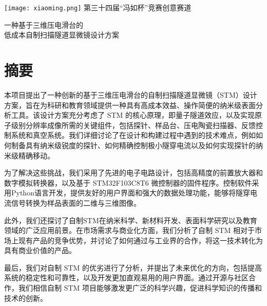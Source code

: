 \documentclass{article}
\begin{document}
\def\Fengru{第三十四届“冯如杯”竞赛创意赛道\\}
\vspace{32pt}
\begin{center}
	\texttt{[image: xiaoming.png]}
	\vskip 6pt
	\xiaoer
	\zhongsong
	第三十四届“冯如杯”竞赛创意赛道
\end{center}
\vspace{12pt}
\begin{spacing}{3}
	\begin{center} 
		\erhao
		\zhongsong
		一种基于三维压电滑台的\\低成本自制扫描隧道显微镜设计方案
	\end{center}
\end{spacing}




\renewcommand{\headrulewidth}{0pt}%
\clearpage
{} %

\xiaosi
\section*{摘要}
{}
\begin{spacing}{1.5}
	\setParDis %
	本项目提出了一种创新的基于三维压电滑台的自制扫描隧道显微镜（STM）设计方案，旨在为科研和教育领域提供一种具有高成本效益、操作简便的纳米级表面分析工具。该设计方案充分考虑了 STM 的核心原理，即量子隧道效应，以及实现原子级别分辨率成像所需的关键组件，包括探针、样品台、压电陶瓷扫描器、反馈控制系统和真空系统。我们详细讨论了在设计和构建过程中遇到的技术难点，例如如何制备具有纳米级锐度的探针、如何精确控制极小隧穿电流以及如何实现探针的纳米级精确移动。
	
	为了解决这些挑战，我们采用了先进的电子电路设计，包括高精度的前置放大器和数字模拟转换器，以及基于 STM32F103C8T6 微控制器的固件程序。控制软件采用Python语言开发，提供友好的用户界面和强大的数据处理功能，能够将隧穿电流信号转换为样品表面的二维与三维图像。
	
	此外，我们还探讨了自制STM在纳米科学、新材料开发、表面科学研究以及教育领域的广泛应用前景。在市场需求与商业化方面，我们分析了自制 STM 相对于市场上现有产品的竞争优势，并讨论了如何通过与工业界的合作，将这一技术转化为具有商业价值的产品。
	
	最后，我们对自制 STM 的优劣进行了分析，并提出了未来优化的方向，包括提高系统的稳定性和可靠性，以及开发更加直观易用的用户界面。通过开源与社区合作，我们相信自制 STM 项目能够激发更广泛的科学兴趣，促进科学知识的传播和技术的创新。
	
	
\end{spacing}
\end{document}
